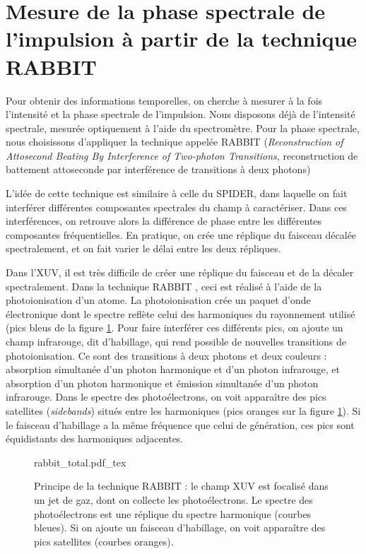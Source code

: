 \section{Mesure de la phase spectrale de l'impulsion à partir de la technique RABBIT}
\label{sec:omabbit}
Pour obtenir des informations temporelles, on cherche à mesurer à la fois l'intensité et la phase spectrale de l'impulsion. Nous disposons déjà de l'intensité spectrale, mesurée optiquement à l'aide du spectromètre. Pour la phase spectrale, nous choisissons d'appliquer la technique appelée RABBIT (\textit{Reconstruction of Attosecond Beating By
Interference of Two-photon Transitions}, reconstruction de battement attoseconde par
interférence de transitions à deux photons)

L'idée de cette technique est similaire à celle du SPIDER, dans laquelle on fait interférer différentes composantes spectrales du champ à caractériser. Dans ces interférences, on retrouve alors la différence de phase entre les différentes composantes fréquentielles. En pratique, on crée une réplique du faisceau décalée spectralement, et on fait varier le délai entre les deux répliques. \par Dans l'XUV, il est très difficile de créer une réplique du faisceau et de la décaler spectralement. Dans la technique RABBIT , ceci est réalisé à l'aide de la photoionisation d'un atome. La photoionisation crée un paquet d'onde électronique dont le spectre reflète celui des harmoniques du rayonnement utilisé (pics bleus de la figure \ref{fig:rabbit}. Pour faire interférer ces différents pics, on ajoute un champ infrarouge, dit d'habillage, qui rend possible de nouvelles transitions de photoionisation. Ce sont des transitions à deux photons et deux couleurs : absorption simultanée d'un photon harmonique et d'un photon infrarouge, et
absorption d'un photon harmonique et émission simultanée d'un photon infrarouge. Dans le spectre des photoélectrons, on voit apparaître des pics satellites (\textit{sidebands}) situés entre les harmoniques (pics oranges sur la figure \ref{fig:rabbit}). Si le faisceau d'habillage a la même fréquence que celui de génération, ces pics sont équidistants des harmoniques adjacentes. 

\begin{figure}[!ht]
\centering
\def\svgwidth{1\columnwidth}
{rabbit_total.pdf_tex}
\caption{Principe de la technique RABBIT : le champ XUV est focalisé dans un jet de gaz, dont on collecte les photoélectrons. Le spectre des photoélectrons est une réplique du spectre harmonique (courbes bleues). Si on ajoute un faisceau d'habillage, on voit apparaître des pics satellites (courbes oranges).}
\label{fig:rabbit}
\end{figure}

